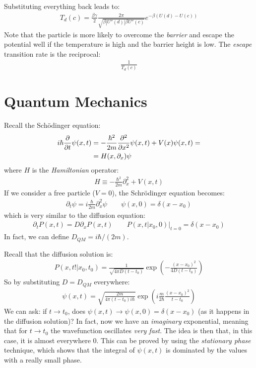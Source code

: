 \documentclass[../template.tex]{subfiles}
\begin{document}
Substituting everything back leads to:
\begin{align*}
    T_d(c) = \frac{\beta \gamma}{2} \frac{2\pi}{\sqrt{ \beta |U''(d)| \beta U''(c)}} e^{-\beta (U(d)- U(c))} 
\end{align*}
Note that the particle is more likely to overcome the \textit{barrier} and escape the potential well if the temperature is high and the barrier height is low. The \textit{escape} transition rate is the reciprocal:
\begin{align*}
    \frac{1}{T_d(c)} 
\end{align*} 

\section{Quantum Mechanics}
Recall the Sch\"odinger equation:
\begin{align*}
    i \hbar \pdv{t} \psi(x,t) &= - \frac{\hbar^2}{2 m} \pdv[2]{x} \psi(x,t) + V(x) \psi(x,t) =\\
    &= H(x, \partial_x) \psi
\end{align*}
where $H$ is the \textit{Hamiltonian} operator:
\begin{align*}
    H \equiv -\frac{\hbar^2}{2m} \partial_x^2 + V(x,t) 
\end{align*}  
If we consider a free particle ($V= 0$), the Schr\"odinger equation becomes:
\begin{align*}
    \partial_t \psi = i \frac{\hbar}{2m} \partial_x^2 \psi  \qquad \psi(x,0) = \delta(x-x_0) 
\end{align*}
which is very similar to the diffusion equation:
\begin{align*}
    \partial_t P(x,t) = D\partial_x P(x,t) \qquad P(x,t|x_0,0) \Big|_{t=0} = \delta(x-x_0)
\end{align*}
In fact, we can define $D_{QM} = i \hbar/(2m)$.

Recall that the diffusion solution is:
\begin{align*}
    P(x,t!|x_0,t_0) = \frac{1}{\sqrt{4 \pi D (t-t_0)}} \exp\left(-\frac{(x - x_0)^2}{4 D (t-t_0)} \right) 
\end{align*}
So by substituting $D = D_{QM}$ everywhere:
\begin{align*}
    \psi(x,t) = \sqrt{\frac{2m}{4 \pi (t-t_0)i \hbar} } \exp\left(i \frac{m}{2\hbar} \frac{(x-x_0)^2}{t-t_0}  \right) 
\end{align*} 
We can ask: if $t \to t_0$, does $\psi(x,t) \to \psi(x,0) = \delta(x- x_0)$ (as it happens in the diffusion solution)? In fact, now we have an \textit{imaginary} exponential, meaning that for $t \to t_0$ the wavefunction oscillates \textit{very fast}. The idea is then that, in this case, it is almost everywhere $0$. This can be proved by using the \textit{stationary phase} technique, which shows that the integral of $\psi(x,t)$ is dominated by the values with a really small phase.
\end{document}

